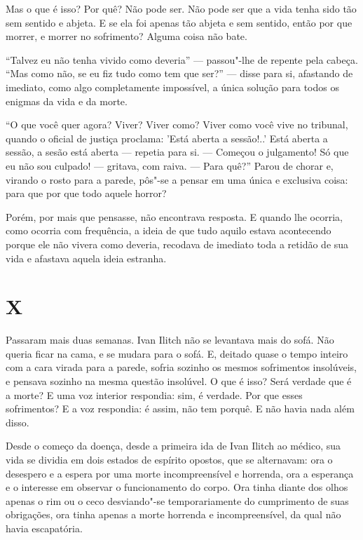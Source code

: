 Mas o que é isso? Por quê? Não pode ser. Não pode ser que a vida tenha
sido tão sem sentido e abjeta. E se ela foi apenas tão abjeta e sem
sentido, então por que morrer, e morrer no sofrimento? Alguma coisa não
bate.

``Talvez eu não tenha vivido como deveria'' --- passou"-lhe de repente pela
cabeça. ``Mas como não, se eu fiz tudo como tem que ser?'' --- disse para
si, afastando de imediato, como algo completamente impossível, a única
solução para todos os enigmas da vida e da morte.

``O que você quer agora? Viver? Viver como? Viver como você vive no
tribunal, quando o oficial de justiça proclama: 'Está aberta a
sessão!..' Está aberta a sessão, a sesão está aberta --- repetia para si.
--- Começou o julgamento! Só que eu não sou culpado! --- gritava, com raiva.
--- Para quê?'' Parou de chorar e, virando o rosto para a parede, pôs"-se a
pensar em uma única e exclusiva coisa: para que por que todo aquele
horror?

Porém, por mais que pensasse, não encontrava resposta. E quando lhe
ocorria, como ocorria com frequência, a ideia de que tudo aquilo estava
acontecendo porque ele não vivera como deveria, recodava de imediato
toda a retidão de sua vida e afastava aquela ideia estranha.

\section*{X}

Passaram mais duas semanas. Ivan Ilitch não se levantava mais do sofá.
Não queria ficar na cama, e se mudara para o sofá. E, deitado quase o
tempo inteiro com a cara virada para a parede, sofria sozinho os mesmos
sofrimentos insolúveis, e pensava sozinho na mesma questão insolúvel. O
que é isso? Será verdade que é a morte? E uma voz interior respondia:
sim, é verdade. Por que esses sofrimentos? E a voz respondia: é assim,
não tem porquê. E não havia nada além disso.

Desde o começo da doença, desde a primeira ida de Ivan Ilitch ao médico,
sua vida se dividia em dois estados de espírito opostos, que se
alternavam: ora o desespero e a espera por uma morte incompreensível e
horrenda, ora a esperança e o interesse em observar o funcionamento do
corpo. Ora tinha diante dos olhos apenas o rim ou o ceco desviando"-se
temporariamente do cumprimento de suas obrigações, ora tinha apenas a
morte horrenda e incompreensível, da qual não havia escapatória.

